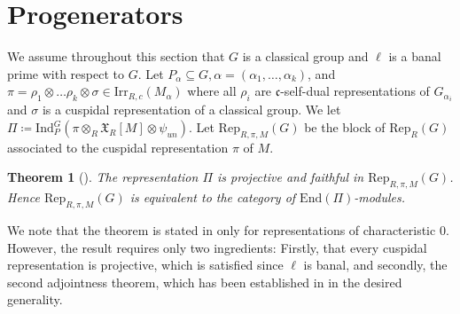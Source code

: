 \documentclass[10pt,a4paper]{article}
\newtheorem{theorem}{Theorem}
\theoremstyle{remark}
\theoremstyle{definition}
\newcommand{\rep}{\mathrm{Rep}}
\newcommand{\ip}{\mathrm{Ind}_P^G}
\newcommand{\xc}{\mathfrak{X}}
\newcommand{\un}{_{un}}
\newcommand{\irr}{\mathrm{Irr}}
\newcommand{\fc}{\mathfrak{c}}
\begin{document}
\section{Progenerators}
We assume throughout this section that $G$ is a classical group and $\ell$ is a banal prime with respect to $G$.
Let $P_\alpha\subseteq G,\alpha=(\alpha_1,\ldots,\alpha_k)$, and $\pi=\rho_1\otimes\ldots\rho_k\otimes\sigma\in\irr_{R,c}(M_\alpha)$ where all $\rho_i$ are $\fc$-self-dual representations of $G_{\alpha_i}$ and $\sigma $ is a cuspidal representation of a classical group. 
We let $\Pi\coloneqq \ip(\pi\otimes_R \xc_R[M]\otimes\psi\un)$.
Let $\rep_{R,\pi,M}(G)$ be the block of $\rep_R(G)$ associated to the cuspidal representation $\pi$ of $M$.
\begin{theorem}[{\cite[1.6]{Roche_2002}}]\label{T:progenerator}
    The representation $\Pi$ is projective and faithful in $\rep_{R,\pi,M}(G)$.
    Hence $\rep_{R,\pi,M}(G)$ is equivalent to the category of $\mathrm{End}(\Pi)$-modules.
\end{theorem}
We note that the theorem is stated in \cite[1.6]{Roche_2002} only for representations of characteristic $0$. However, the result requires only two ingredients: Firstly, that every cuspidal representation is projective, which is satisfied since $\ell$ is banal, and secondly, the second adjointness theorem, which has been established in \cite[Corollary 1.3]{DatHelmKurinczukMoss_2024_2} in the desired generality.
\end{document}
